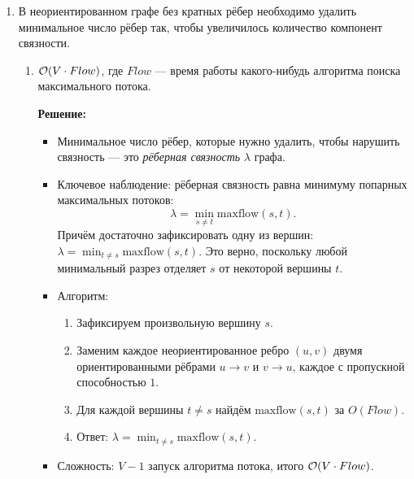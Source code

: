 \begin{enumerate}
\begin{enumerate}
      \item
        А теперь тот же вопрос, но ещё есть разные скидочные предложения! \\
        Скидка позволяет два инструмента $i, j$ купить по специальной цене $d \colon \max(p_i, p_j) < d < p_i + p_j$.
        Каждый инструмент присутствует не более чем в одном скидочном предложении.
    \end{enumerate}

  \item
    В неориентированном графе без кратных рёбер необходимо удалить минимальное число рёбер так,
    чтобы увеличилось количество компонент связности.
    \begin{enumerate}
      \item $\mathcal{O}(V \cdot Flow)$, где $Flow$ --- время работы какого-нибудь алгоритма поиска максимального потока.

        \textbf{Решение:}

        \begin{itemize}
          \item Минимальное число рёбер, которые нужно удалить, чтобы нарушить связность --- это \emph{рёберная связность} $\lambda$ графа.

          \item Ключевое наблюдение: рёберная связность равна минимуму попарных максимальных потоков:
          $$\lambda = \min_{s \ne t} \mathrm{maxflow}(s, t).$$
          Причём достаточно зафиксировать одну из вершин: $\lambda = \min_{t \ne s} \mathrm{maxflow}(s, t)$.
          Это верно, поскольку любой минимальный разрез отделяет $s$ от некоторой вершины $t$.

          \item Алгоритм:
          \begin{enumerate}
            \item Зафиксируем произвольную вершину $s$.
            \item Заменим каждое неориентированное ребро $(u, v)$ двумя ориентированными рёбрами $u \to v$ и $v \to u$, каждое с пропускной способностью $1$.
            \item Для каждой вершины $t \ne s$ найдём $\mathrm{maxflow}(s, t)$ за $O(Flow)$.
            \item Ответ: $\lambda = \min_{t \ne s} \mathrm{maxflow}(s, t)$.
          \end{enumerate}

          \item Сложность: $V - 1$ запуск алгоритма потока, итого $\mathcal{O}(V \cdot Flow)$.


\end{itemize}
\end{enumerate}
\end{enumerate}
